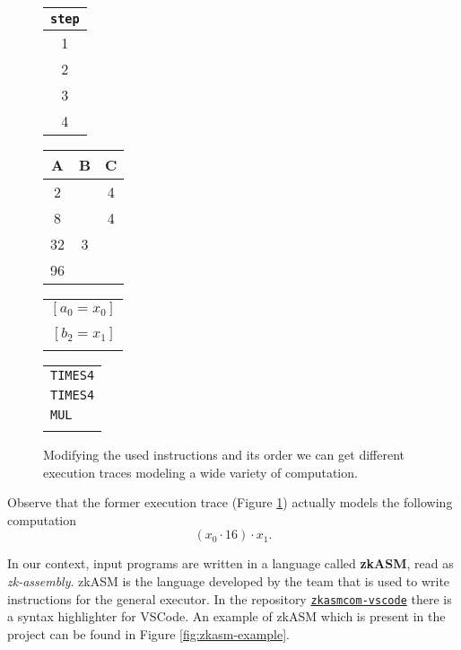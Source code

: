 \begin{figure}[h!]

\centering

\begin{tabular}{|c|}
\hline
\texttt{step} \\ \hline
1  \\ \hline
2  \\ \hline
3 \\ \hline
4 \\ \hline
\end{tabular}
\begin{tabular}{|c|c|c|}
\hline
\textbf{A} & \textbf{B} & \cellcolor{lightgray} \textbf{C} \\ \hline
2 &  & \cellcolor{lightgray} 4\\ \hline
8 & & \cellcolor{lightgray} 4 \\ \hline
32 & 3 & \cellcolor{lightgray} \\ \hline
96 & & \cellcolor{lightgray} \\ \hline
\end{tabular}
\hspace{1mm}
\begin{tabular}{r}
\\
$[a_0=x_0]$  \\
\\
$[b_2 = x_1]$         \\
\\

\end{tabular}
\hspace{1em}
\begin{tabular}{l}
\\
\texttt{TIMES4} \\
\texttt{TIMES4} \\
\texttt{MUL} \\
\\
\end{tabular}

\caption{Modifying the used instructions and its order we can get different execution traces modeling a wide variety of computation. }
\label{fig:changing-computation}
\end{figure}

Observe that the former execution trace (Figure \ref{fig:changing-computation}) actually models the following computation
\[
(x_0\cdot16)\cdot x_1.
\]



In our context, input programs are written in a language called \textbf{zkASM}, read as \textit{zk-assembly}. zkASM is the language developed by the team that is used to write instructions for the general executor. In the repository \href{https://github.com/0xPolygonHermez/zkasmcom-vscode}{\texttt{zkasmcom-vscode}} there is a syntax highlighter for VSCode. An example of zkASM which is present in the project can be found in Figure \ref{fig:zkasm-example}.

